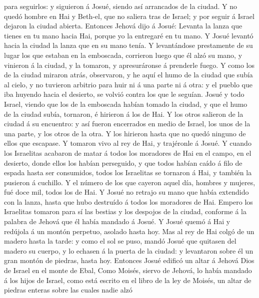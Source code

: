 para seguirlos: y siguieron á Josué, siendo así arrancados de la ciudad.
 Y no quedó hombre en Hai y Beth-el, que no saliera tras
de Israel; y por seguir á Israel dejaron la ciudad abierta.
 Entonces Jehová dijo á Josué: Levanta la lanza que
tienes en tu mano hacia Hai, porque yo la entregaré en tu mano. Y Josué
levantó hacia la ciudad la lanza que en su mano tenía.  Y
levantándose prestamente de su lugar los que estaban en la emboscada,
corrieron luego que él alzó su mano, y vinieron á la ciudad, y la
tomaron, y apresuráronse á prenderle fuego.  Y como los
de la ciudad miraron atrás, observaron, y he aquí el humo de la ciudad
que subía al cielo, y no tuvieron arbitrio para huir ni á una parte ni á
otra: y el pueblo que iba huyendo hacia el desierto, se volvió contra
los que le seguían.  Josué y todo Israel, viendo que los
de la emboscada habían tomado la ciudad, y que el humo de la ciudad
subía, tornaron, é hirieron á los de Hai.  Y los otros
salieron de la ciudad á su encuentro: y así fueron encerrados en medio
de Israel, los unos de la una parte, y los otros de la otra. Y los
hirieron hasta que no quedó ninguno de ellos que escapase.
 Y tomaron vivo al rey de Hai, y trajéronle á Josué.
 Y cuando los Israelitas acabaron de matar á todos los
moradores de Hai en el campo, en el desierto, donde ellos los habían
perseguido, y que todos habían caído á filo de espada hasta ser
consumidos, todos los Israelitas se tornaron á Hai, y también la
pusieron á cuchillo.  Y el número de los que cayeron
aquel día, hombres y mujeres, fué doce mil, todos los de Hai.
 Y Josué no retrajo su mano que había extendido con la
lanza, hasta que hubo destruído á todos los moradores de Hai.
 Empero los Israelitas tomaron para sí las bestias y los
despojos de la ciudad, conforme á la palabra de Jehová que él había
mandado á Josué.  Y Josué quemó á Hai y redújola á un
montón perpetuo, asolado hasta hoy.  Mas al rey de Hai
colgó de un madero hasta la tarde: y como el sol se puso, mandó Josué
que quitasen del madero su cuerpo, y lo echasen á la puerta de la
ciudad: y levantaron sobre él un gran montón de piedras, hasta hoy.
 Entonces Josué edificó un altar á Jehová Dios de Israel
en el monte de Ebal,  Como Moisés, siervo de Jehová, lo
había mandado á los hijos de Israel, como está escrito en el libro de la
ley de Moisés, un altar de piedras enteras sobre las cuales nadie alzó
